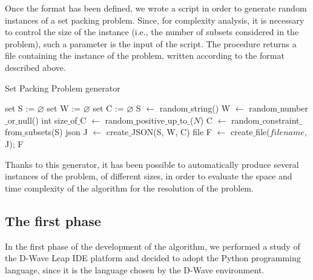 \documentclass[oneside,a4paper]{article}
\begin{document}
Once the format has been defined, we wrote a script in order to generate random instances of a set packing problem. Since, for complexity analysis, it is necessary to control the size of the instance (i.e., the number of subsets considered in the problem), such a parameter is the input of the script. The procedure returns a file containing the instance of the problem, written according to the format described above.
\begin{algorithm}
\caption{Set Packing Problem generator}
\begin{algorithmic}[1]

    \Variables
    \State set S := $\varnothing$  
    \State set W := $\varnothing$  
    \State set C := $\varnothing$  
    \EndVariables
        \State S $\leftarrow$ random$\_$string()   
        \State W $\leftarrow$ random$\_$number$\_$or$\_$null()  
    \EndWhile  \label{loop}
    \State int size$\_$of$\_$C $\leftarrow$ random$\_$positive$\_$up$\_$to$\_$($N$)  
        \State C $\leftarrow$ random$\_$constraint$\_$from$\_$subsets(S) 
    \EndWhile  \label{loop1}
    \State json J $\leftarrow$ create$\_$JSON(S, W, C)   
    \State file F $\leftarrow$ create$\_$file($filename$, J);  
    \State \Return F  
\EndProcedure

\end{algorithmic}
\end{algorithm}
Thanks to this generator, it has been possible to automatically produce several instances of the problem, of different sizes, in order to evaluate the space and time complexity of the algorithm for the resolution of the problem. 
\subsection{The first phase}
In the first phase of the development of the algorithm, we performed a study of the D-Wave Leap IDE platform and decided to adopt the Python programming language, since it is the language chosen by the D-Wave environment. 
\end{document}
